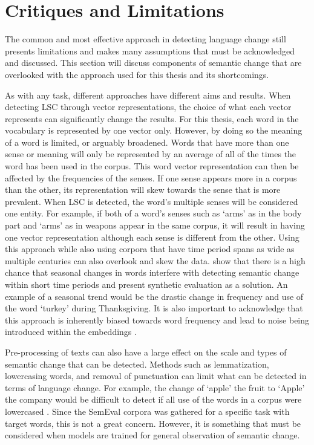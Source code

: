 \section{Critiques and Limitations}
\label{sec:critiques}

The common and most effective approach in detecting language change still presents limitations and makes many assumptions that must be acknowledged and discussed. This section will discuss components of semantic change that are overlooked with the approach used for this thesis and its shortcomings. 

As with any task, different approaches have different aims and results. When detecting LSC through vector representations, the choice of what each vector represents can significantly change the results. For this thesis, each word in the vocabulary is represented by one vector only. However, by doing so the meaning of a word is limited, or arguably broadened. Words that have more than one sense or meaning will only be represented by an average of all of the times the word has been used in the corpus. This word vector representation can then be affected by the frequencies of the senses. If one sense appears more in a corpus than the other, its representation will skew towards the sense that is more prevalent.  When LSC is detected, the word’s multiple senses will be considered one entity. For example, if both of a word’s senses such as ‘arms’ as in the body part and ‘arms’ as in weapons appear in the same corpus, it will result in having one vector representation although each sense is different from the other. Using this approach while also using corpora that have time period spans as wide as multiple centuries can also overlook and skew the data. \citet{shoemark-etal-2019-room} show that there is a high chance that seasonal changes in words interfere with detecting semantic change within short time periods and present synthetic evaluation as a solution. An example of a seasonal trend would be the drastic change in frequency and use of the word `turkey' during Thanksgiving. It is also important to acknowledge that this approach is inherently biased towards word frequency and lead to noise being introduced within the embeddings \citep{dubossarsky-etal-2017-outta, kaiser-etal-2020-ims, schlechtweg-etal-2020-semeval}.

Pre-processing of texts can also have a large effect on the scale and types of semantic change that can be detected. Methods such as lemmatization, lowercasing words, and removal of punctuation can limit what can be detected in terms of language change. For example, the change of `apple' the fruit to `Apple' the company would be difficult to detect if all use of the words in a corpus were lowercased \citep{tahmasebi-survey2018}. Since the SemEval corpora was gathered for a specific task with target words, this is not a great concern. However, it is something that must be considered when models are trained for general observation of semantic change.

